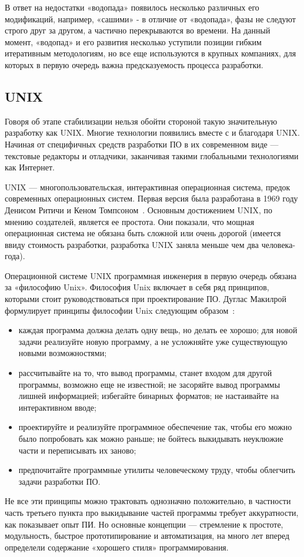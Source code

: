 В ответ на недостатки «водопада» появилось несколько различных его модификаций, например, «сашими» - в отличие от «водопада», фазы не следуют строго друг за другом, а частично перекрываются во времени. На данный момент, «водопад» и его развития несколько уступили позиции гибким итеративным методологиям, но все еще используются в крупных компаниях, для которых в первую очередь важна предсказуемость процесса разработки.

\subsection{UNIX}

Говоря об этапе стабилизации нельзя обойти стороной такую значительную разработку как UNIX. Многие технологии появились вместе с и благодаря UNIX. Начиная от специфичных средств разработки ПО в их современном виде — текстовые редакторы и отладчики, заканчивая такими глобальными технологиями как Интернет.

UNIX — многопользовательская, интерактивная операционная система, предок современных операционных систем. Первая версия была разработана в 1969 году Денисом Ритичи и Кеном Томпсоном~\cite{Ritchie:1974:UTS}. Основным достижением UNIX, по мнению создателей, является ее простота. Они показали, что мощная операционная система не обязана быть сложной или очень дорогой (имеется ввиду стоимость разработки, разработка UNIX заняла меньше чем два человека-года).

Операционной системе UNIX программная инженерия в первую очередь обязана за «философию Unix». Философия Unix включает в себя ряд принципов, которыми стоит руководствоваться при проектирование ПО. Дуглас Макилрой формулирует принципы философии Unix следующим образом~\cite{McIlroy:1978:UTS}:
\begin{itemize}
  \item каждая программа должна делать одну вещь, но делать ее хорошо; для новой задачи реализуйте новую программу, а не усложняйте уже существующую новыми возможностями;
  \item рассчитывайте на то, что вывод программы, станет входом для другой программы, возможно еще не известной; не засоряйте вывод программы лишней информацией; избегайте бинарных форматов; не настаивайте на интерактивном вводе;
  \item проектируйте и реализуйте программное обеспечение так, чтобы его можно было попробовать как можно раньше; не бойтесь выкидывать неуклюжие части и переписывать их заново;
  \item предпочитайте программные утилиты человеческому труду, чтобы облегчить задачи разработки ПО.
\end{itemize}

Не все эти принципы можно трактовать однозначно положительно, в частности часть третьего пункта про выкидывание частей программы требует аккуратности, как показывает опыт ПИ. Но основные концепции — стремление к простоте, модульность, быстрое прототипирование и автоматизация, на много лет вперед определели содержание «хорошего стиля» программирования.

